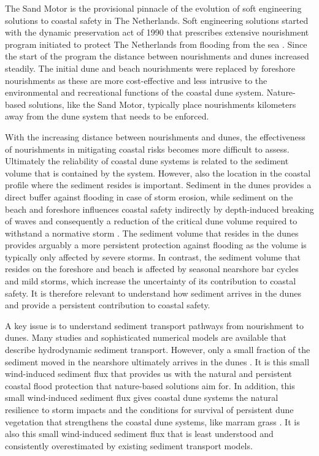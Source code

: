 The Sand Motor is the provisional pinnacle of the evolution of soft
engineering solutions to coastal safety in The Netherlands. Soft
engineering solutions started with the dynamic preservation act of
1990 that prescribes extensive nourishment program initiated to
protect The Netherlands from flooding from the sea
\citep{MinVW1990b}. Since the start of the program the distance
between nourishments and dunes increased steadily. The initial dune
and beach nourishments were replaced by foreshore nourishments as
these are more cost-effective and less intrusive to the environmental
and recreational functions of the coastal dune system. Nature-based
solutions, like the Sand Motor, typically place nourishments
kilometers away from the dune system that needs to be enforced.

With the increasing distance between nourishments and dunes, the
effectiveness of nourishments in mitigating coastal risks becomes more
difficult to assess. Ultimately the reliability of coastal dune
systems is related to the sediment volume that is contained by the
system. However, also the location in the coastal profile where the
sediment resides is important. Sediment in the dunes provides a direct
buffer against flooding in case of storm erosion, while sediment on
the beach and foreshore influences coastal safety indirectly by
depth-induced breaking of waves and consequently a reduction of the
critical dune volume required to withstand a normative storm
\citep{Walstra2016}. The sediment volume that resides in the dunes
provides arguably a more persistent protection against flooding as the
volume is typically only affected by severe storms. In contrast, the
sediment volume that resides on the foreshore and beach is affected by
seasonal nearshore bar cycles and mild storms, which increase the
uncertainty of its contribution to coastal safety. It is therefore
relevant to understand how sediment arrives in the dunes and provide a
persistent contribution to coastal safety.

A key issue is to understand sediment transport pathways from
nourishment to dunes. Many studies and sophisticated numerical models
are available that describe hydrodynamic sediment transport. However,
only a small fraction of the sediment moved in the nearshore
ultimately arrives in the dunes \citep{Aagaard2004}. It is this small
wind-induced sediment flux that provides us with the natural and
persistent coastal flood protection that nature-based solutions aim
for. In addition, this small wind-induced sediment flux gives coastal
dune systems the natural resilience to storm impacts and the
conditions for survival of persistent dune vegetation that strengthens
the coastal dune systems, like marram grass \citep{Borsje2011}. It is
also this small wind-induced sediment flux that is least understood
and consistently overestimated by existing sediment transport models.

